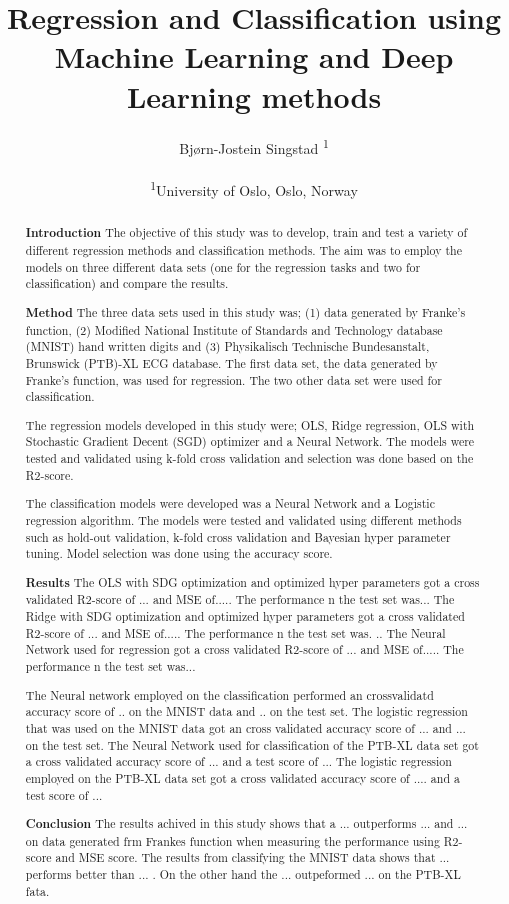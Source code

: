 \documentclass[twocolumn]{cinc}
\title{Regression and Classification using Machine Learning and Deep Learning methods}
\author{Bjørn-Jostein Singstad \textsuperscript{1}\\ \ \\
\textsuperscript{1}University of Oslo, Oslo, Norway}
\begin{document}
\maketitle

\begin{abstract}

\textbf{Introduction}
The objective of this study was to develop, train and test a variety of different regression methods and classification methods. The aim was to employ the models on three different data sets (one for the regression tasks and two for classification) and compare the results.

\textbf{Method}
The three data sets used in this study was; (1) data generated by Franke's function, (2) Modified National Institute of Standards and Technology database (MNIST) hand written digits  and (3) Physikalisch Technische Bundesanstalt, Brunswick (PTB)-XL ECG database. The first data set, the data generated by Franke's function, was used for regression. The two other data set were used for classification.

The regression models developed in this study were;  OLS, Ridge regression, OLS with Stochastic Gradient Decent (SGD) optimizer and a Neural Network. The models were tested and validated using k-fold cross validation and selection was done based on the R2-score. 

The classification models were developed was a Neural Network and a Logistic regression algorithm. The models were tested and validated using different methods such as hold-out validation, k-fold cross validation and Bayesian hyper parameter tuning. Model selection was done using the accuracy score. 

\textbf{Results}
The OLS with SDG optimization and optimized hyper parameters got a cross validated  R2-score of ... and MSE of..... The performance n the test set was... The Ridge with SDG optimization and optimized hyper parameters got a cross validated  R2-score of ... and MSE of..... The performance n the test set was. .. The Neural Network used for regression got a cross validated  R2-score of ... and MSE of..... The performance n the test set was...

The Neural network employed on the classification performed an crossvalidatd accuracy score of ..  on the MNIST data and .. on the test set. The logistic regression that was used on the MNIST data got an cross validated accuracy score of ... and ... on the test set.
The Neural Network used for classification of the PTB-XL data set got a cross validated accuracy score of ... and a test score of ...
The logistic regression employed on the PTB-XL data set got a cross validated accuracy score of .... and a test score of ...

\textbf{Conclusion}
The results achived in this study shows that a ... outperforms ... and ... on data generated frm Frankes function when measuring the performance using R2-score and MSE score. The results from classifying the MNIST data shows that ... performs better than ... . On the other hand the ... outpeformed ... on the PTB-XL fata.

\end{abstract}
\end{document}

